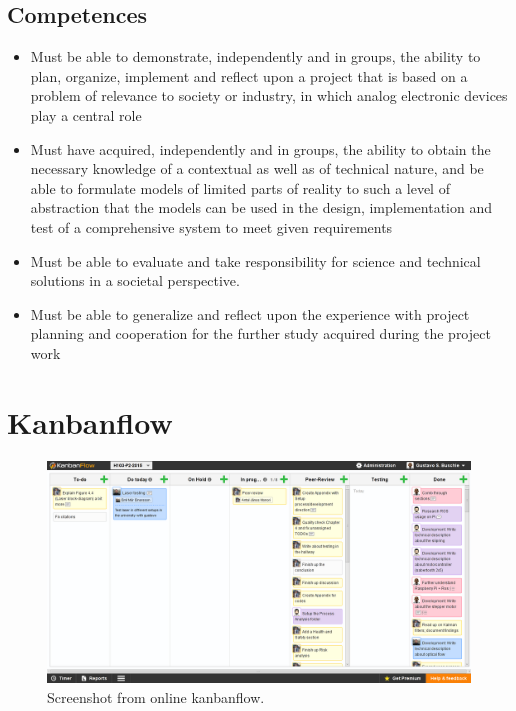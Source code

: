 \subsection{Competences}
\begin{itemize}
	\item Must be able to demonstrate, independently and in groups, the ability to plan, organize, implement and reflect upon a project that is based on a problem of relevance to society or industry, in which analog electronic devices play a central role
	\item Must have acquired, independently and in groups, the ability to obtain the necessary knowledge of a contextual as well as of technical nature, and be able to formulate models of limited parts of reality to such a level of abstraction that the models can be used in the design, implementation and test of a comprehensive system to meet given requirements
	\item Must be able to evaluate and take responsibility for science and technical solutions in a societal perspective.
	\item Must be able to generalize and reflect upon the experience with project planning and cooperation for the further study acquired during the project work
\end{itemize}

\clearpage
\section{Kanbanflow}\label{appendix:kanbanflow}

\begin{figure}[H]
	\centering
	\includegraphics[width=1\linewidth]{images/kanban.png}
	\caption{Screenshot from online kanbanflow.}
	\label{fig:kanban}
\end{figure}

